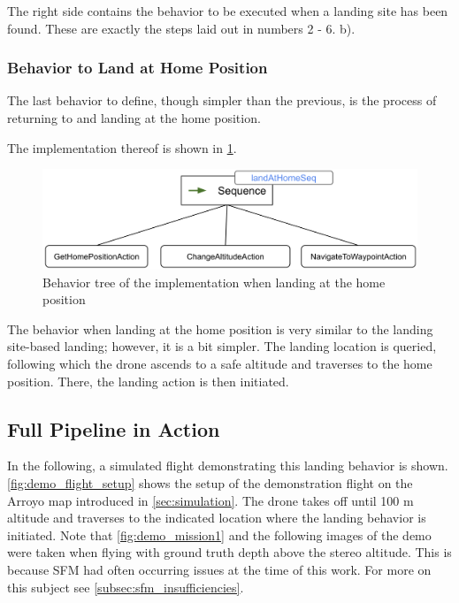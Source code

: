 The right side contains the behavior to be executed when a landing site has been found. These are exactly the steps laid out in numbers 2 - 6. b).


\subsubsection{Behavior to Land at Home Position}

The last behavior to define, though simpler than the previous, is the process of returning to and landing at the home position. 

The implementation thereof is shown in \cref{fig:bt_land_at_home}.

\begin{figure}[h]
\centering
\includegraphics[scale=0.2]{images/autonomous_landing/land_at_home_beh.png}
\caption{Behavior tree of the implementation when landing at the home position}
\label{fig:bt_land_at_home}
\end{figure}

The behavior when landing at the home position is very similar to the landing site-based landing; however, it is a bit simpler. The landing location is queried, following which the drone ascends to a safe altitude and traverses to the home position. There, the landing action is then initiated.

\clearpage%


\subsection{Full Pipeline in Action}

In the following, a simulated flight demonstrating this landing behavior is shown. \cref{fig:demo_flight_setup} shows the setup of the demonstration flight on the Arroyo map introduced in \cref{sec:simulation}. The drone takes off until 100 m altitude and traverses to the indicated location where the landing behavior is initiated. Note that \cref{fig:demo_mission1} and the following images of the demo were taken when flying with ground truth depth above the stereo altitude. This is because SFM had often occurring issues at the time of this work. For more on this subject see \cref{subsec:sfm_insufficiencies}.

